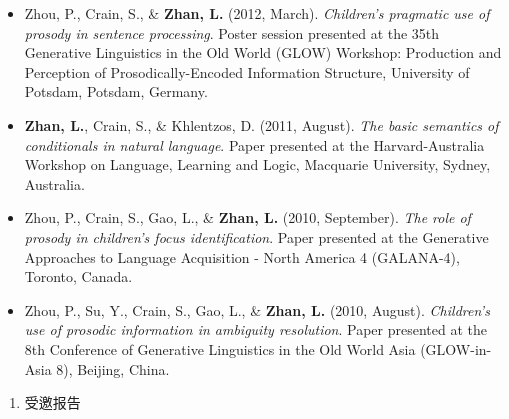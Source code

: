 \documentclass[12pt,]{article}
\providecommand{\tightlist}{%
  \setlength{\itemsep}{0pt}\setlength{\parskip}{0pt}}
\begin{document}
\begin{itemize}
{  interpretation of conditionals}. Paper presented at the 7th
  International Conference on Thinking (ICT2012), Birkbeck/UCL, London,
  UK.
\item
  Zhou, P., Crain, S., \& \textbf{Zhan, L.} (2012, March).
  \emph{Children's pragmatic use of prosody in sentence processing}.
  Poster session presented at the 35th Generative Linguistics in the Old
  World (GLOW) Workshop: Production and Perception of
  Prosodically-Encoded Information Structure, University of Potsdam,
  Potsdam, Germany.
\item
  \textbf{Zhan, L.}, Crain, S., \& Khlentzos, D. (2011, August).
  \emph{The basic semantics of conditionals in natural language}. Paper
  presented at the Harvard-Australia Workshop on Language, Learning and
  Logic, Macquarie University, Sydney, Australia.
\item
  Zhou, P., Crain, S., Gao, L., \& \textbf{Zhan, L.} (2010, September).
  \emph{The role of prosody in children's focus identification}. Paper
  presented at the Generative Approaches to Language Acquisition - North
  America 4 (GALANA-4), Toronto, Canada.
\item
  Zhou, P., Su, Y., Crain, S., Gao, L., \& \textbf{Zhan, L.} (2010,
  August). \emph{Children's use of prosodic information in ambiguity
  resolution}. Paper presented at the 8th Conference of Generative
  Linguistics in the Old World Asia (GLOW-in-Asia 8), Beijing, China.
\end{itemize}

\begin{enumerate}
\def\labelenumi{\arabic{enumi}.}
\setcounter{enumi}{4}
\tightlist
\item
  受邀报告
\end{enumerate}
\end{document}
